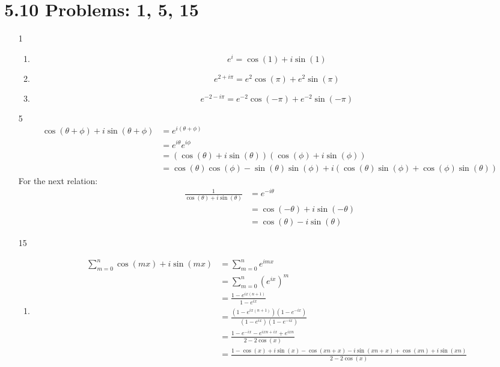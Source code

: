 \documentclass{article}
\begin{document}
  \section{5.10 Problems: 1, 5, 15}
  \begin{enumerate}
    \item[1]
      \begin{enumerate}[label=(\roman*)]
        \item\[e^i=\cos(1)+i\sin(1)\]
        \item\[e^{2+i\pi}=e^2\cos(\pi)+e^2\sin(\pi)\]
        \item\[e^{-2-i\pi}=e^{-2}\cos(-\pi)+e^{-2}\sin(-\pi)\]
      \end{enumerate}
    \item[5]
      \begin{align*}
        \cos(\theta+\phi)+i\sin(\theta+\phi)&=e^{i(\theta+\phi)}\\
        &=e^{i\theta}e^{i\phi}\\
        &=(\cos(\theta)+i\sin(\theta))(\cos(\phi)+i\sin(\phi))\\
        &=\cos(\theta)\cos(\phi)-\sin(\theta)\sin(\phi)+i(\cos(\theta)\sin(\phi)+\cos(\phi)\sin(\theta))
      \end{align*}
      For the next relation:
      \begin{align*}
        \frac{1}{\cos(\theta)+i\sin(\theta)}&=e^{-i\theta}\\
        &=\cos(-\theta)+i\sin(-\theta)\\
        &=\cos(\theta)-i\sin(\theta)
      \end{align*}
    \item[15]
      \begin{enumerate}[label=(\roman*)]
        \item
          \begin{align*}
            \sum_{m=0}^n\cos(mx)+i\sin(mx)&=\sum_{m=0}^ne^{imx}\\
            &=\sum_{m=0}^n\left(e^{ix}\right)^m\\
            &=\frac{1-e^{ix(n+1)}}{1-e^{ix}}\\
            &=\frac{(1-e^{ix(n+1)})(1-e^{-ix})}{(1-e^{ix})(1-e^{-ix})}\\
            &=\frac{1-e^{-ix}-e^{ixn+ix}+e^{ixn}}{2-2\cos(x)}\\
            &=\frac{1-\cos(x)+i\sin(x)-\cos(xn+x)-i\sin(xn+x)+\cos(xn)+i\sin(xn)}{2-2\cos(x)}\\
          \end{align*}

\end{enumerate}
\end{enumerate}
\end{document}
